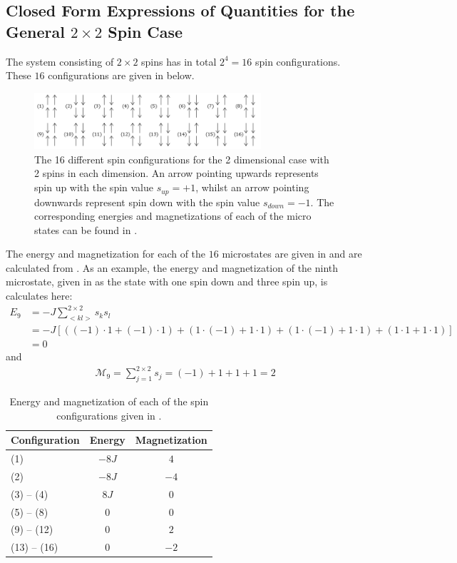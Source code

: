 \subsection{Closed Form Expressions of Quantities for the General $2\times 2$ Spin Case}
\label{sec:ClosedFormSolution}
The system consisting of $2\times 2$ spins has in total $2^4 = 16$ spin configurations. 
These $16$ configurations are given in  below. 
\begin{figure}[H]
	\centering
	\includegraphics[width=0.75\textwidth]{Figures/Configurations.png}
	\caption{The 16 different spin configurations for the 2 dimensional case with 2 spins in each dimension. An arrow pointing upwards represents spin up with the spin value $s_{up}=+1$, whilst an arrow pointing downwards represent spin down with the spin value $s_{down}=-1$. The corresponding energies and magnetizations of each of the micro states can be found in .}
	\label{fig:SpinConfigurations}
\end{figure}
The energy and magnetization for each of the $16$ microstates are given in  and are calculated from . 
As an example, the energy and magnetization of the ninth microstate, given in  as the state with one spin down and three spin up, is calculates here:
\begin{align*}
	E_9 &= -J \sum_{<kl>} ^{2\times 2} s_k s_l
	\\
	&= -J[((-1)\cdot 1 + (-1) \cdot 1)+(1\cdot (-1) + 1\cdot 1) + (1\cdot (-1) + 1\cdot 1 ) +(1\cdot 1 + 1\cdot 1)]
	\\
	&= 0
\end{align*}
and
\begin{align*}
	\mathcal{M} _9 = \sum _{j=1} ^{2\times 2} s_j = (-1) + 1 + 1 + 1 = 2
\end{align*}
\begin{table}[H]
\centering
\caption{Energy and magnetization of each of the spin configurations given in .}
\begin{center}
\begin{tabular}{ |l | c | c | }
  \hline			
  Configuration & Energy & Magnetization  \\
  \hline
  (1) & $-8J$ & $4$ \\
  \hline
  (2) & $-8J$ & $-4$ \\
  \hline
  (3) -- (4) & $8J$ & $0$ \\
  \hline
  (5) -- (8) & $0$ & $0$ \\
  \hline
  (9) -- (12) & $0$ & $2$ \\
  \hline
  (13) -- (16) & $0$ & $-2$ \\
  \hline
\end{tabular}
\end{center}
\label{tab:ClosedFormSolution1}
\end{table}
